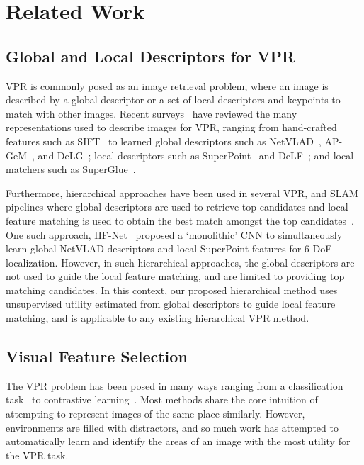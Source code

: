 \documentclass[letterpaper, 10 pt, conference]{ieeeconf}  \fi
\begin{document}
\ifarxiv
\setlength{\topmargin}{-24pt}
\setlength{\headheight}{0pt}
\fi
\section{Related Work}
\subsection{Global and Local Descriptors for VPR}
\label{sec:LitDescriptors}

VPR is commonly posed as an image retrieval problem, where an image is described by a global descriptor or a set of local descriptors and keypoints to match with other images. Recent surveys~\cite{masone2021survey, garg2021where, lowry2015visual} have reviewed the many representations used to describe images for VPR, ranging from hand-crafted features such as SIFT~\cite{lowe2004distinctive} to learned global descriptors such as NetVLAD~\cite{arandjelovic2016netvlad}, AP-GeM~\cite{revaud2019learning}, and DeLG~\cite{cao2020unifying}; local descriptors such as SuperPoint~\cite{detone2018superpoint} and DeLF~\cite{cao2020unifying}; and local matchers such as SuperGlue~\cite{sarlin2020superglue}.

Furthermore, hierarchical approaches have been used in several VPR, and SLAM pipelines where global descriptors are used to retrieve top candidates and local feature matching is used to obtain the best match amongst the top candidates~\cite{cummins2011appearance,garg2018lost,mur2015orb,engel2014lsd}. One such approach, HF-Net~\cite{sarlin2019coarse} proposed a `monolithic' CNN to simultaneously learn global NetVLAD descriptors and local SuperPoint features for 6-DoF localization. However, in such hierarchical approaches, the global descriptors are not used to guide the local feature matching, and are limited to providing top matching candidates. In this context, our proposed hierarchical method uses unsupervised utility estimated from global descriptors to guide local feature matching, and is applicable to any existing hierarchical VPR method.

\subsection{Visual Feature Selection}
\label{sec:LitSemantics}
The VPR problem has been posed in many ways ranging from a classification task~\cite{chen2017deep,cao2020unifying} to contrastive learning~\cite{arandjelovic2016netvlad,revaud2019learning,radenovic2018fine}. Most methods share the core intuition of attempting to represent images of the same place similarly. However, environments are filled with distractors, and so much work has attempted to automatically learn and identify the areas of an image with the most utility for the VPR task.
\end{document}
